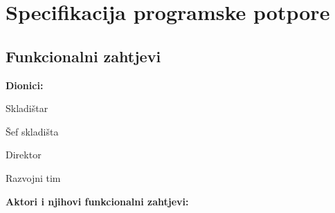\chapter{Specifikacija programske potpore}
		
	\section{Funkcionalni zahtjevi}
			
			
			\noindent \textbf{Dionici:}
			
			\begin{packed_enum}
				
				\item Skladištar
				\item Šef skladišta			
				\item Direktor
				\item Razvojni tim
				
			\end{packed_enum}
			
			\noindent \textbf{Aktori i njihovi funkcionalni zahtjevi:}
			
